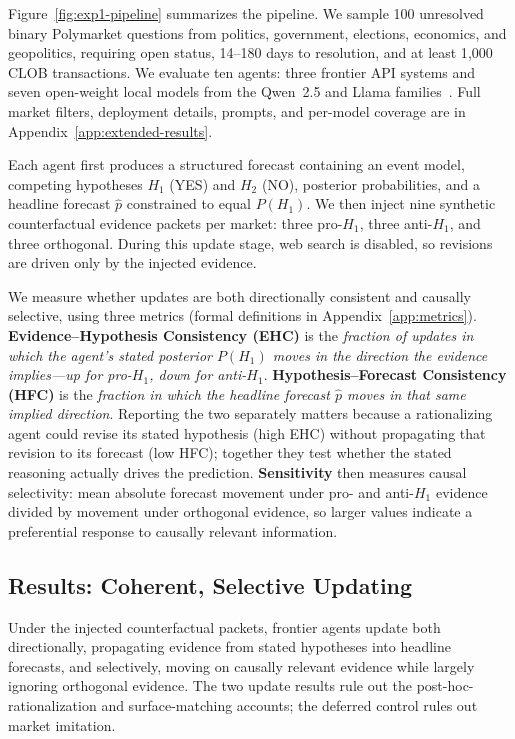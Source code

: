 \documentclass{article} %
\begin{document}
Figure~\ref{fig:exp1-pipeline} summarizes the pipeline. We sample 100 unresolved binary Polymarket questions from politics, government, elections, economics, and geopolitics, requiring open status, 14--180 days to resolution, and at least 1{,}000 CLOB transactions. We evaluate ten agents: three frontier API systems and seven open-weight local models from the Qwen~2.5 and Llama families~\citep{qwen2025qwen25,grattafiori2024llama}. Full market filters, deployment details, prompts, and per-model coverage are in Appendix~\ref{app:extended-results}.

Each agent first produces a structured forecast containing an event model, competing hypotheses $H_1$ (YES) and $H_2$ (NO), posterior probabilities, and a headline forecast $\hat p$ constrained to equal $P(H_1)$. We then inject nine synthetic counterfactual evidence packets per market: three pro-$H_1$, three anti-$H_1$, and three orthogonal. During this update stage, web search is disabled, so revisions are driven only by the injected evidence.

We measure whether updates are both directionally consistent and causally selective, using three metrics (formal definitions in Appendix~\ref{app:metrics}). \textbf{Evidence--Hypothesis Consistency (EHC)} is the \textit{fraction of updates in which the agent's stated posterior $P(H_1)$ moves in the direction the evidence implies---up for pro-$H_1$, down for anti-$H_1$}. \textbf{Hypothesis--Forecast Consistency (HFC)} is the \textit{fraction in which the headline forecast $\hat p$ moves in that same implied direction}. Reporting the two separately matters because a rationalizing agent could revise its stated hypothesis (high EHC) without propagating that revision to its forecast (low HFC); together they test whether the stated reasoning actually drives the prediction. \textbf{Sensitivity} then measures causal selectivity: mean absolute forecast movement under pro- and anti-$H_1$ evidence divided by movement under orthogonal evidence, so larger values indicate a preferential response to causally relevant information.

\subsection{Results: Coherent, Selective Updating}
\label{sec:exp1-results}

Under the injected counterfactual packets, frontier agents update both directionally, propagating evidence from stated hypotheses into headline forecasts, and selectively, moving on causally relevant evidence while largely ignoring orthogonal evidence. The two update results rule out the post-hoc-rationalization and surface-matching accounts; the deferred control rules out market imitation.
\end{document}
